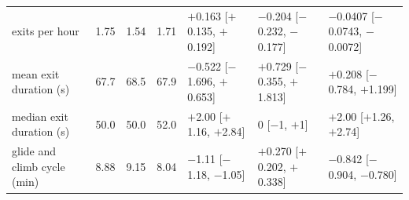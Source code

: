 \begin{tabular}{@{}l r r r l l l@{}}
exits per hour & 1.75 & 1.54 & 1.71 & $+$0.163 [$+$0.135, $+$0.192] & $-$0.204 [$-$0.232, $-$0.177] & $-$0.0407 [$-$0.0743, $-$0.0072] \\
mean exit duration (s) & 67.7 & 68.5 & 67.9 & $-$0.522 [$-$1.696, $+$0.653] & $+$0.729 [$-$0.355, $+$1.813] & $+$0.208 [$-$0.784, $+$1.199] \\
median exit duration (s) & 50.0 & 50.0 & 52.0 & $+$2.00 [$+$1.16, $+$2.84] & 0 [$-$1, $+$1] & $+$2.00 [$+$1.26, $+$2.74] \\
glide and climb cycle (min) & 8.88 & 9.15 & 8.04 & $-$1.11 [$-$1.18, $-$1.05] & $+$0.270 [$+$0.202, $+$0.338] & $-$0.842 [$-$0.904, $-$0.780] \\
\bottomrule
\end{tabular}
